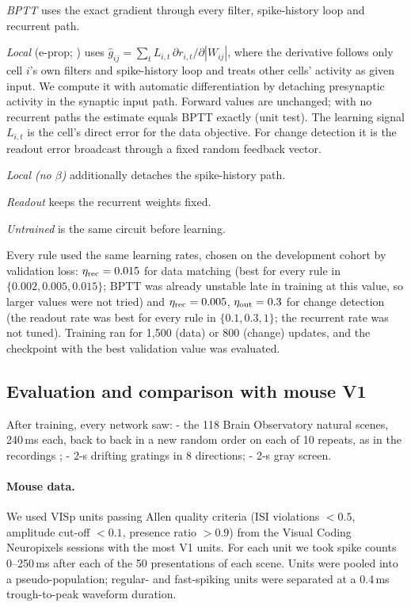 \emph{BPTT} uses the exact gradient through every filter, spike-history loop and recurrent path.

\emph{Local} (e-prop; \citealp{bellec2020eprop}) uses
$\hat g_{ij}=\sum_t L_{i,t}\,\partial r_{i,t}/\partial|W_{ij}|$, where the derivative follows only
cell $i$'s own filters and spike-history loop and treats other cells' activity as given input. We
compute it with automatic differentiation by detaching presynaptic activity in the synaptic input
path. Forward values are unchanged; with no recurrent paths the estimate equals BPTT exactly
(unit test). The learning signal $L_{i,t}$ is the cell's direct error for the data objective. For
change detection it is the readout error broadcast through a fixed random feedback vector.

\emph{Local (no $\beta$)} additionally detaches the spike-history path.

\emph{Readout} keeps the recurrent weights fixed.

\emph{Untrained} is the same circuit before learning.

Every rule used the same learning rates, chosen on the development cohort by validation loss:
$\eta_{\rm rec}=0.015$ for data matching (best for every rule in $\{0.002,0.005,0.015\}$; BPTT was
already unstable late in training at this value, so larger values were not tried) and
$\eta_{\rm rec}=0.005$, $\eta_{\rm out}=0.3$ for change detection (the readout rate was best for every
rule in $\{0.1,0.3,1\}$; the recurrent rate was not tuned). Training ran for 1{,}500 (data) or 800
(change) updates, and the checkpoint with the best validation value was evaluated.

\subsection{Evaluation and comparison with mouse V1}
After training, every network saw:
- the 118 Brain Observatory natural scenes, 240\,ms each, back to back in a new random order on
  each of 10 repeats, as in the recordings \citep{siegle2021,devries2020};
- 2-s drifting gratings in 8 directions;
- 2-s gray screen.

\paragraph{Mouse data.} We used VISp units passing Allen quality criteria (ISI violations
$<0.5$, amplitude cut-off $<0.1$, presence ratio $>0.9$) from the Visual Coding Neuropixels
sessions with the most V1 units. For each unit we took spike counts 0--250\,ms after each of the 50
presentations of each scene. Units were pooled into a pseudo-population; regular- and fast-spiking
units were separated at a 0.4\,ms trough-to-peak waveform duration.

